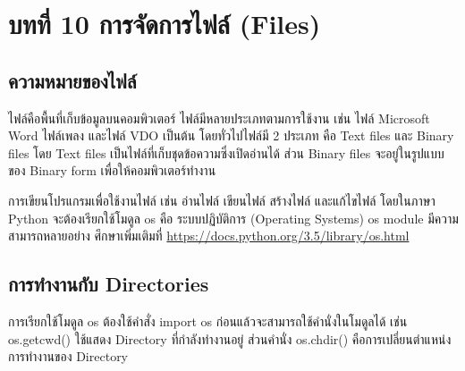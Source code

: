 \chapter{บทที่ 10	การจัดการไฟล์ (Files)}
\section{ความหมายของไฟล์}

ไฟล์คือพื้นที่เก็บข้อมูลบนคอมพิวเตอร์ ไฟล์มีหลายประเภทตามการใช้งาน เช่น ไฟล์ Microsoft Word ไฟล์เพลง และไฟล์ VDO เป็นต้น โดยทั่วไปไฟล์มี 2 ประเภท คือ Text files และ Binary files โดย Text files เป็นไฟล์ที่เก็บชุดข้อความซึ่งเปิดอ่านได้ ส่วน Binary files จะอยู่ในรูปแบบของ Binary form เพื่อให้คอมพิวเตอร์ทำงาน

การเขียนโปรแกรมเพื่อใช้งานไฟล์ เช่น อ่านไฟล์ เขียนไฟล์ สร้างไฟล์ และแก้ไขไฟล์ โดยในภาษา Python จะต้องเรียกใช้โมดูล os คือ ระบบปฏิบัติการ (Operating Systems) os module มีความสามารถหลายอย่าง ศึกษาเพิ่มเติมที่ \url{https://docs.python.org/3.5/library/os.html}

\section{การทำงานกับ Directories}

การเรียกใช้โมดูล os ต้องใช้คำสั่ง import os ก่อนแล้วจะสามารถใช้คำนั่งในโมดูลได้ เช่น os.getcwd() ใช้แสดง Directory ที่กำลังทำงานอยู่ ส่วนคำนั่ง os.chdir() คือการเปลี่ยนตำแหน่งการทำงานของ Directory

\begin{pycode}
\end{pycode}

